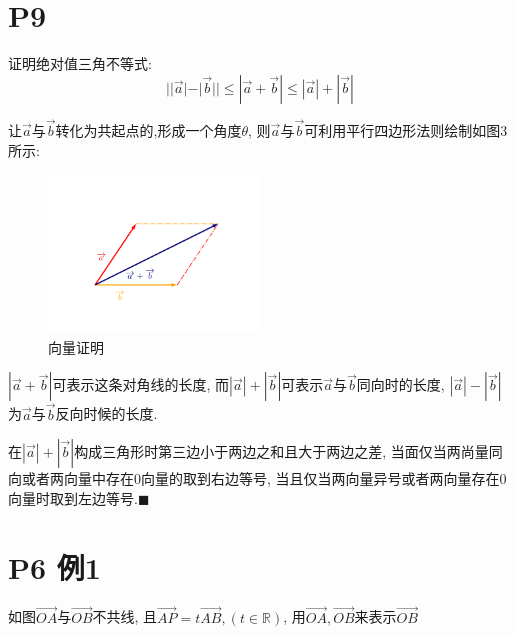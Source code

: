 \documentclass{book}
\begin{document}
    \section{\textcolor[rgb]{0.11,0.65,0.52}{P9}}
    \begin{boxB}
        证明\textcolor[rgb]{0.38,0.11,0.2}{绝对值三角不等式}: $$
        ||\overrightarrow{a}|-|\overrightarrow{b}||\le|\overrightarrow{a}+\overrightarrow{b}|\le|\overrightarrow{a}|+|\overrightarrow{b}|
        $$
    \end{boxB}

    让$\overrightarrow{a}$与$\overrightarrow{b}$转化为共起点的,形成一个角度$\theta$, 则$\overrightarrow{a}$与$\overrightarrow{b}$可利用平行四边形法则绘制如图3所示:
    \begin{figure}[htbp]
        \centering
        \includegraphics[width=0.5\textwidth]{img/vector.png}
        \caption{向量证明}
    \end{figure}

    $\displaystyle |\overrightarrow{a}+\overrightarrow{b}|$可表示这条对角线的长度, 而$|\overrightarrow{a}|+|\overrightarrow{b}|$可表示$\overrightarrow{a}$与$\overrightarrow{b}$同向时的长度, $|\overrightarrow{a}|-|\overrightarrow{b}|$为$\overrightarrow{a}$与$\overrightarrow{b}$反向时候的长度.

    在$|\overrightarrow{a}|+|\overrightarrow{b}|$构成三角形时\textcolor[rgb]{0.75,0.17,0.22}{第三边小于两边之和且大于两边之差}, 当面仅当两尚量同向或者两向量中存在0向量的取到右边等号, 当且仅当两向量异号或者两向量存在0向量时取到左边等号.$\blacksquare$

    \section{\textcolor[rgb]{0.11,0.65,0.52}{P6 例1}}

    如图$\overrightarrow{OA}$与$\overrightarrow{OB}$不共线, 且$\overrightarrow{AP}=t\overrightarrow{AB}, (t\in \mathbb{R})$, 用$\overrightarrow{OA},\overrightarrow{OB}$来表示$\overrightarrow{OB}$
\end{document}
